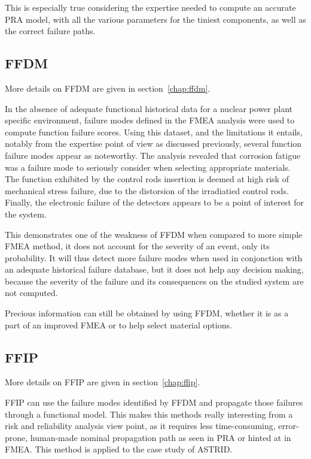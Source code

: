 This is especially true considering the expertise needed to compute an accurate PRA model, with all the various parameters for the tiniest components, as well as the correct failure paths.

\subsection{FFDM}

More details on FFDM are given in section~\ref{chap:ffdm}.

In the absence of adequate functional historical data for a nuclear power plant specific environment, failure modes defined in the FMEA analysis were used to compute function failure scores. Using this dataset, and the limitations it entails, notably from the expertise point of view as discussed previously, several function failure modes appear as noteworthy. The analysis revealed that corrosion fatigue was a failure mode to seriously consider when selecting appropriate materials. The function exhibited by the control rods insertion is deemed at high risk of mechanical stress failure, due to the distorsion of the irradiatied control rods. Finally, the electronic failure of the detectors appears to be a point of interest for the system.

This demonstrates one of the weakness of FFDM when compared to more simple FMEA method, it does not account for the severity of an event, only its probability. It will thus detect more failure modes when used in conjonction with an adequate historical failure database, but it does not help any decision making, because the severity of the failure and its consequences on the studied system are not computed.

Precious information can still be obtained by using FFDM, whether it is as a part of an improved FMEA or to help select material options.

\subsection{FFIP}

More details on FFIP are given in section~\ref{chap:ffip}.

FFIP can use the failure modes identified by FFDM and propagate those failures through a functional model. This makes this methods really interesting from a risk and reliability analysis view point, as it requires less time-consuming, error-prone, human-made nominal propagation path as seen in PRA or hinted at in FMEA. This method is applied to the case study of ASTRID.


